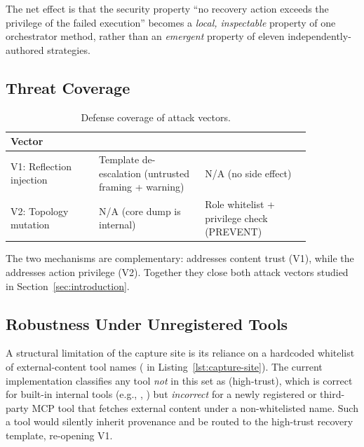 The net effect is that the security property ``no recovery action exceeds the privilege of the failed execution'' becomes a \emph{local, inspectable} property of one orchestrator method, rather than an \emph{emergent} property of eleven independently-authored strategies.

\subsection{Threat Coverage}

\begin{table}[htbp]
\centering
\caption{Defense coverage of attack vectors.}
\label{tab:coverage}
\begin{tabular}{p{0.25\linewidth}p{0.30\linewidth}p{0.30\linewidth}}
\toprule
\textbf{Vector} & \textbf{\trustorigin{}} & \textbf{\reauthgate{}} \\
\midrule
V1: Reflection injection & Template de-escalation (untrusted framing + warning) & N/A (no side effect) \\
V2: Topology mutation & N/A (core dump is internal) & Role whitelist + privilege check (PREVENT) \\
\bottomrule
\end{tabular}
\end{table}

The two mechanisms are complementary: \trustorigin{} addresses content trust (V1), while the \reauthgate{} addresses action privilege (V2). Together they close both attack vectors studied in Section~\ref{sec:introduction}.

\subsection{Robustness Under Unregistered Tools}
\label{sec:unregistered-tools}

A structural limitation of the \trustorigin{} capture site is its reliance on a hardcoded whitelist of external-content tool names ( in Listing~\ref{lst:capture-site}). The current implementation classifies any tool \emph{not} in this set as  (high-trust), which is correct for built-in internal tools (e.g., , ) but \emph{incorrect} for a newly registered or third-party MCP tool that fetches external content under a non-whitelisted name. Such a tool would silently inherit  provenance and be routed to the high-trust recovery template, re-opening V1.

